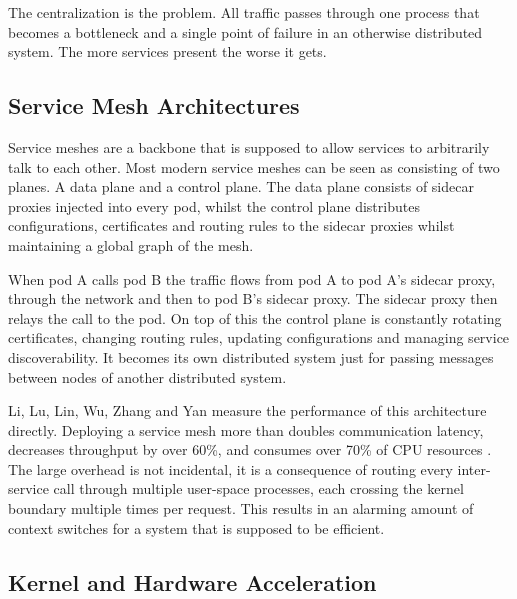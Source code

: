\documentclass[a4paper,11pt]{article}
\begin{document}
The centralization is the problem. All traffic passes through one process that becomes a bottleneck and a single point of failure
in an otherwise distributed system. The more services present the worse it gets.

\subsection{Service Mesh Architectures}
Service meshes are a backbone that is supposed to allow services to arbitrarily talk to each other.
Most modern service meshes can be seen as consisting of two planes. A data plane and a control plane.
The data plane consists of sidecar proxies injected into every pod, whilst the control plane
distributes configurations, certificates and routing rules to the sidecar proxies whilst maintaining a
global graph of the mesh.

When pod A calls pod B the traffic flows from pod A to pod A's sidecar proxy, through the network and then to pod B's sidecar proxy.
The sidecar proxy then relays the call to the pod. On top of this the control plane is constantly rotating certificates, changing
routing rules, updating configurations and managing service discoverability. It becomes its own distributed system just for passing messages
between nodes of another distributed system.

Li, Lu, Lin, Wu, Zhang and Yan measure the performance of this architecture directly.
Deploying a service mesh more than doubles communication latency, decreases throughput by over 60\%, and consumes over
70\% of CPU resources \cite{liFlatProxyDPUcentricService2023}. The large overhead is not incidental, it is a
consequence of routing every inter-service call through multiple user-space processes, each crossing the kernel boundary multiple
times per request. This results in an alarming amount of context switches for a system that is supposed to be efficient.

\subsection{Kernel and Hardware Acceleration}
\end{document}
